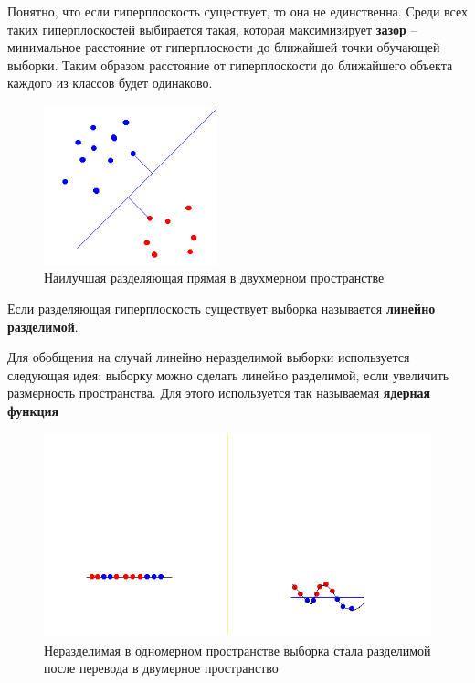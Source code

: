 Понятно, что если гиперплоскость существует, то она не единственна. Среди всех таких гиперплоскостей выбирается такая, которая максимизирует \textbf{зазор} -- минимальное расстояние от гиперплоскости до ближайшей точки обучающей выборки. Таким образом расстояние от гиперплоскости до ближайшего объекта каждого из классов будет одинаково.

\begin{figure}[h]
\begin{center}
\includegraphics[width=5cm]{img/svm}
\end{center}
\caption{Наилучшая разделяющая прямая в двухмерном пространстве}
\label{svm}
\end{figure}

Если разделяющая гиперплоскость существует выборка называется \textbf{линейно разделимой}.

Для обобщения на случай линейно неразделимой выборки используется следующая идея: выборку можно сделать линейно разделимой, если увеличить размерность пространства. Для этого используется так называемая \textbf{ядерная функция}

\begin{figure}[h]
\begin{center}
\includegraphics[width=15cm]{img/svm2}
\end{center}
\caption{Неразделимая в одномерном пространстве выборка стала разделимой после перевода в двумерное пространство}
\label{svm-kernel}
\end{figure}

